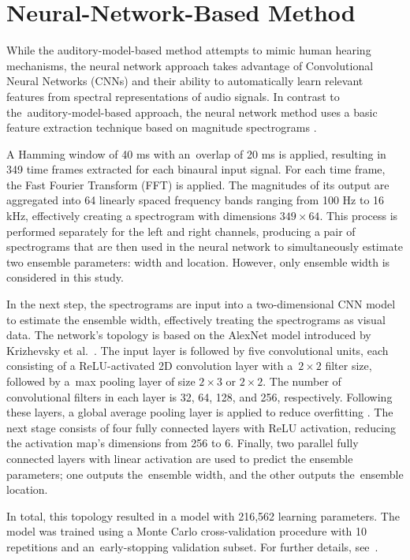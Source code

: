\section{Neural-Network-Based Method}
\label{sec:methods:neural}

While the auditory-model-based method attempts to mimic human hearing mechanisms, the neural network approach takes advantage of Convolutional Neural Networks (CNNs) and their ability to automatically learn relevant features from spectral representations of audio signals. In contrast to the~auditory-model-based approach, the neural network method uses a basic feature extraction technique based on magnitude spectrograms \cite{antoniuk_estimating_2024}.

A Hamming window of 40 ms with an~overlap of 20 ms is applied, resulting in 349 time frames extracted for each binaural input signal. For each time frame, the Fast Fourier Transform (FFT) is applied. The magnitudes of its output are aggregated into 64 linearly spaced frequency bands ranging from 100 Hz to 16 kHz, effectively creating a spectrogram with dimensions $349 \times 64$. This process is performed separately for the left and right channels, producing a pair of spectrograms that are then used in the neural network to simultaneously estimate two ensemble parameters: width and location. However, only ensemble width is considered in this study.

In the next step, the spectrograms are input into a two-dimensional CNN model to estimate the ensemble width, effectively treating the spectrograms as visual data. The network's topology is based on the AlexNet model introduced by Krizhevsky et al.~\cite{krizhevsky_imagenet_2017}. The input layer is followed by five convolutional units, each consisting of a ReLU-activated 2D convolution layer with a~$2 \times 2$ filter size, followed by a~max pooling layer of size $2 \times 3$ or $2 \times 2$. The number of convolutional filters in each layer is 32, 64, 128, and 256, respectively. Following these layers, a global average pooling layer is applied to reduce overfitting \cite{lin_network_2013}. The next stage consists of four fully connected layers with ReLU activation, reducing the activation map's dimensions from 256 to 6. Finally, two parallel fully connected layers with linear activation are used to predict the ensemble parameters; one outputs the~ensemble width, and the other outputs the~ensemble location.

In total, this topology resulted in a model with 216,562 learning parameters. The model was trained using a Monte Carlo cross-validation procedure with 10 repetitions and an~early-stopping validation subset. For further details, see~\cite{antoniuk_estimating_2024}.
